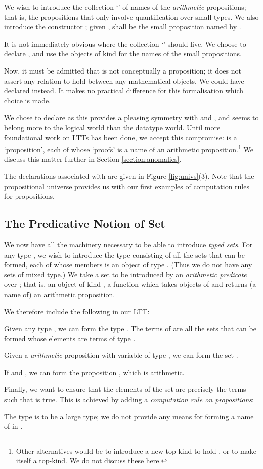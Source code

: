 \documentclass[acmtocl]{acmtrans2m}
\begin{document}
We wish to introduce the collection `' of names of the
\emph{arithmetic} propositions; that is, the propositions that only
involve quantification over small types.  We also introduce the constructor ; given ,  shall be the small proposition named by .

It is not immediately
obvious where the collection `' should live.
We choose to declare , and use the objects of kind  for the names of the small propositions.

Now, it must be admitted that
 is not conceptually a proposition; it does not assert any
relation to hold between any mathematical objects.
We could have declared  instead.
It makes no
practical difference for this formalisation which choice is made.

We chose to declare  as this provides a pleasing symmetry with
 and , and  seems to belong more to the logical world than the datatype world.
Until more foundational work on LTTs has been done, we accept this compromise:  is
a `proposition', each of whose `proofs' is a name of an arithmetic
proposition.\footnote{Other alternatives would be to introduce a new
top-kind to hold , or to make  itself a top-kind.  We do not discuss these here.}  We discuss this matter further in Section \ref{section:anomalies}.

The declarations associated with  are given in Figure \ref{fig:univs}(3). Note that the
propositional universe provides us with our first examples of
computation rules for propositions.

\subsection{The Predicative Notion of Set}
\label{section:set}

We now have all the machinery necessary to be able to introduce
\emph{typed sets}.  For any type , we wish to introduce the type
 consisting of all the sets that can be formed, each of
whose members is an object of type .  (Thus we do not have any
sets of mixed type.)  We take a set to be introduced by an
\emph{arithmetic predicate} over ; that is, an object of kind , a function which takes objects of  and returns (a name of) an
arithmetic proposition.

\pagebreak

We therefore include the following in our LTT:
\begin{longitem}
\item
Given any type , we can form the type .  The terms of  are all the sets that can be formed whose elements are terms of type .
\item
Given a \emph{arithmetic} proposition  with variable  of type , we can form the set .
\item
If  and , we can form the proposition , which is arithmetic.
\item
Finally, we want to ensure that the elements of the set  are precisely the terms  such that  is true.  This is achieved by adding a \emph{computation rule on propositions}:

\end{longitem}
The type  is to be a large type; we do not provide any means for forming a name of  in .
\end{document}
